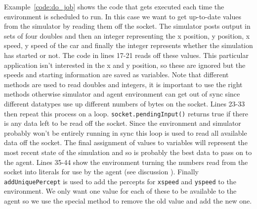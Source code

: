 Example~\ref{code:do_job} shows the code that gets executed each time the environment is scheduled to run.  In this case we want to get up-to-date values from the simulator by reading them off the socket.  The simulator posts output in sets of four doubles and then an integer representing the x position, y position, x speed, y speed of the car and finally the integer represents whether the simulation has started or not.  The code in lines 17-21 reads off these values.  This particular application isn't interested in the x and y position, so these are ignored but the speeds and starting information are saved as variables.  Note that different methods are used to read doubles and integers, it is important to use the right methods otherwise simulator and agent environment can get out of sync since different datatypes use up different numbers of bytes on the socket.  Lines 23-33 then repeat this process on a loop.  \texttt{socket.pendingInput()} returns true if there is any data left to be read off the socket.  Since the environment and simulator probably won't be entirely running in sync this loop is used to read all available data off the socket.  The final assignment of values to variables will represent the most recent state of the simulation and so is probably the best data to pass on to the agent.  Lines 35-44 show the environment turning the numbers read from the socket into literals for use by the agent (see discussion ).  Finally \texttt{addUniquePercept} is used to add the percepts for \texttt{xspeed} and \texttt{yspeed} to the environment.  We only want one value for each of these to be available to the agent so we use the special method to remove the old value and add the new one.

